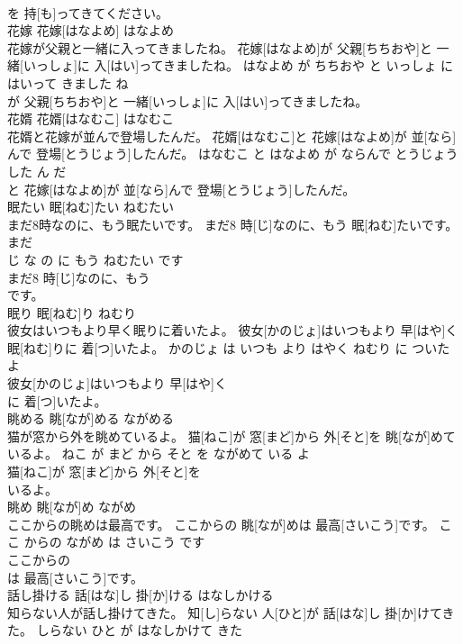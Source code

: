 \documentclass[8pt]{extreport}
\begin{document}
\begin{CJK}{UTF8}{min}
\\	を 持[も]ってきてください。			
\\	花嫁	花嫁[はなよめ]	はなよめ	
\\	花嫁が父親と一緒に入ってきましたね。	花嫁[はなよめ]が 父親[ちちおや]と 一緒[いっしょ]に 入[はい]ってきましたね。	はなよめ が ちちおや と いっしょ に はいって きました ね	
\\	が 父親[ちちおや]と 一緒[いっしょ]に 入[はい]ってきましたね。			
\\	花婿	花婿[はなむこ]	はなむこ	
\\	花婿と花嫁が並んで登場したんだ。	花婿[はなむこ]と 花嫁[はなよめ]が 並[なら]んで 登場[とうじょう]したんだ。	はなむこ と はなよめ が ならんで とうじょう した ん だ	
\\	と 花嫁[はなよめ]が 並[なら]んで 登場[とうじょう]したんだ。			
\\	眠たい	眠[ねむ]たい	ねむたい	
\\	まだ8時なのに、もう眠たいです。	まだ8 時[じ]なのに、もう 眠[ねむ]たいです。	まだ 
\\	じ な の に もう ねむたい です	
\\	まだ8 時[じ]なのに、もう
\\	です。			
\\	眠り	眠[ねむ]り	ねむり	
\\	彼女はいつもより早く眠りに着いたよ。	彼女[かのじょ]はいつもより 早[はや]く 眠[ねむ]りに 着[つ]いたよ。	かのじょ は いつも より はやく ねむり に ついた よ	
\\	彼女[かのじょ]はいつもより 早[はや]く
\\	に 着[つ]いたよ。			
\\	眺める	眺[なが]める	ながめる	
\\	猫が窓から外を眺めているよ。	猫[ねこ]が 窓[まど]から 外[そと]を 眺[なが]めているよ。	ねこ が まど から そと を ながめて いる よ	
\\	猫[ねこ]が 窓[まど]から 外[そと]を
\\	いるよ。			
\\	眺め	眺[なが]め	ながめ	
\\	ここからの眺めは最高です。	ここからの 眺[なが]めは 最高[さいこう]です。	ここ からの ながめ は さいこう です	
\\	ここからの
\\	は 最高[さいこう]です。			
\\	話し掛ける	話[はな]し 掛[か]ける	はなしかける	
\\	知らない人が話し掛けてきた。	知[し]らない 人[ひと]が 話[はな]し 掛[か]けてきた。	しらない ひと が はなしかけて きた	

\end{CJK}
\end{document}
